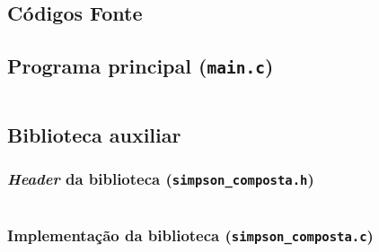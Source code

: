 \begin{apendicesenv}

\partapendices

\chapter{Códigos Fonte}
\label{ch:codigos_fonte}
	\section{Programa principal (\texttt{main.c})}
		\label{sec:main.c}
		\inputminted[autogobble,breaklines,linenos,frame=lines,tabsize=4,obeytabs=true,fontsize=\footnotesize
		]{c}{source_codes/main.c}

	\section{Biblioteca auxiliar}
		\subsection{\emph{Header} da biblioteca (\texttt{simpson\_composta.h})}
		\label{sec:simpson_composta.h}
			\inputminted[autogobble,breaklines,linenos,frame=lines,tabsize=4,obeytabs=true,fontsize=\footnotesize
			]{c}{source_codes/simpson_composta.h}

		\subsection{Implementação da biblioteca (\texttt{simpson\_composta.c})}
			\label{sec:simpson_composta.c}
			\inputminted[autogobble,breaklines,linenos,frame=lines,tabsize=4,obeytabs=true,fontsize=\footnotesize
			]{c}{source_codes/simpson_composta.c}

\end{apendicesenv}
